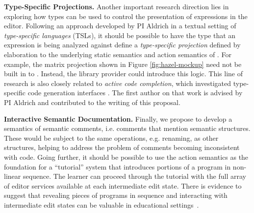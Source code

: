 \vspace{0.25ex}
\noindent\textbf{Type-Specific Projections.} Another important research
direction lies in exploring how types can be used to control  
the presentation of expressions in the editor. Following an
approach developed by PI Aldrich in a textual setting of \emph{type-specific
languages} (TSLs), it should be possible to have the type that an
expression is being analyzed against define a \emph{type-specific projection} defined by elaboration to the underlying static semantics and action semantics of \HazelEnv \cite{TSLs}. For example, the matrix projection shown in Figure \ref{fig:hazel-mockup} need not be built in to \HazelEnv. Instead, the  library provider could introduce this logic. This line of research is also closely related to \emph{active code completion}, which investigated type-specific code generation interfaces \cite{Omar:2012:ACC:2337223.2337324}. The first author on that work is advised by PI Aldrich and contributed to the writing of this proposal.

\vspace{0.25ex}
\noindent\textbf{Interactive Semantic Documentation.} Finally, we propose
to develop a semantics of semantic comments, 
i.e. comments that mention semantic structures. These would be subject to
the same operations, e.g. renaming, as other structures, helping to address
the problem of comments becoming inconsistent with code. Going further, it should be possible to use the 
action semantics as the foundation for a ``tutorial'' system that introduces portions of a program in non-linear
sequence. The learner can proceed through the tutorial with the full array of
editor services available at each intermediate edit state. There is evidence to
suggest that revealing pieces of programs in sequence and interacting with
intermediate edit states can be valuable in educational settings~\cite{Bennedsen:2005:RPP:1047344.1047413,Paxton:2002:LPL:771322.771332}.  
